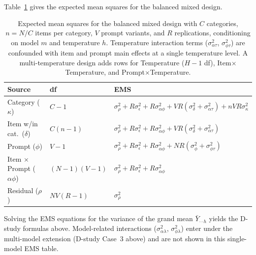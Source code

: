 Table~\ref{tab:ems} gives the expected mean squares for the balanced mixed design.

\begin{table}[ht]
\centering
\caption{Expected mean squares for the balanced mixed design with $C$ categories, $n = N/C$ items per category, $V$ prompt variants, and $R$ replications, conditioning on model $m$ and temperature $h$. Temperature interaction terms ($\sigma^2_{\alpha\tau}$, $\sigma^2_{\phi\tau}$) are confounded with item and prompt main effects at a single temperature level. A multi-temperature design adds rows for Temperature ($H-1$ df), Item$\times$Temperature, and Prompt$\times$Temperature.}
\label{tab:ems}
\small
\begin{tabular}{lll}
\toprule
\textbf{Source} & \textbf{df} & \textbf{EMS} \\
\midrule
Category ($\kappa$) & $C - 1$ & $\sigma^2_\rho + R\sigma^2_\epsilon + R\sigma^2_{\alpha\phi} + VR(\sigma^2_\delta + \sigma^2_{\alpha\tau}) + nVR\sigma^2_\kappa$ \\
Item w/in cat.\ ($\delta$) & $C(n-1)$ & $\sigma^2_\rho + R\sigma^2_\epsilon + R\sigma^2_{\alpha\phi} + VR(\sigma^2_\delta + \sigma^2_{\alpha\tau})$ \\
Prompt ($\phi$) & $V - 1$ & $\sigma^2_\rho + R\sigma^2_\epsilon + R\sigma^2_{\alpha\phi} + NR(\sigma^2_\phi + \sigma^2_{\phi\tau})$ \\
Item $\times$ Prompt ($\alpha\phi$) & $(N-1)(V-1)$ & $\sigma^2_\rho + R\sigma^2_\epsilon + R\sigma^2_{\alpha\phi}$ \\
Residual ($\rho$) & $NV(R-1)$ & $\sigma^2_\rho$ \\
\bottomrule
\end{tabular}
\end{table}

Solving the EMS equations for the variance of the grand mean $\bar{Y}_{\cdot\cdot h}$ yields the D-study formulas above. Model-related interactions ($\sigma^2_{\alpha\lambda}$, $\sigma^2_{\phi\lambda}$) enter under the multi-model extension (D-study Case~3 above) and are not shown in this single-model EMS table.



